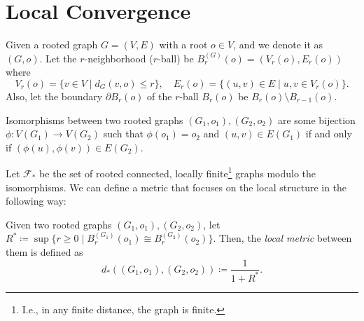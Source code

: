 \chapter{Local Convergence}
Given a rooted graph \(G = (V, E)\) with a root \(o \in V\), and we denote it as \((G, o)\). Let the \(r\)-neighborhood (\(r\)-ball) be \(B_r^{(G)}(o) = (V_r(o), E_r(o))\) where
\[
	V_r(o)
	= \{ v \in V \mid d_G(v, o) \leq r \},\quad
	E_r(o)
	= \{ (u, v) \in E \mid u, v \in V_r(o) \} .
\]
Also, let the boundary \(\partial B_r(o)\) of the \(r\)-ball \(B_r(o)\) be \(B_r(o) \setminus B_{r-1}(o)\).

\begin{note}
	Isomorphisms between two rooted graphs \((G_1, o_1), (G_2, o_2)\) are some bijection \(\phi \colon V(G_1) \to V(G_2)\) such that \(\phi (o_1) = o_2\) and \((u, v) \in E(G_1)\) if and only if \((\phi (u), \phi (v)) \in E(G_2)\).
\end{note}

Let \(\mathcal{F} _{\ast} \) be the set of rooted connected, locally finite\footnote{I.e., in any finite distance, the graph is finite.} graphs modulo the isomorphisms. We can define a metric that focuses on the local structure in the following way:

\begin{definition}\label{def:local-metric}
	Given two rooted graphs \((G_1, o_1), (G_2, o_2)\), let \(R^{\ast} \coloneqq \sup \{ r \geq 0 \mid B_r^{(G_1)}(o_1) \cong B_r^{(G_2)}(o_2) \}\). Then, the \emph{local metric} between them is defined as
	\[
		d_{\ast} ((G_1, o_1) , (G_2, o_2))
		\coloneqq \frac{1}{1 + R^{\ast} }.
	\]
\end{definition}

